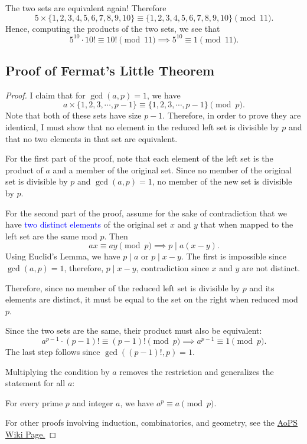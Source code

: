 \clearpage

The two sets are equivalent again! Therefore $$5\times \{1,2,3,4,5,6,7,8,9,10\}\equiv \{1,2,3,4,5,6,7,8,9,10\}\pmod{11}.$$ Hence, computing the products of the two sets, we see that $$5^{10}\cdot 10!\equiv 10!\pmod{11}\implies 5^{10}\equiv 1\pmod{11}.$$ 


\subsection{Proof of Fermat's Little Theorem}
\begin{proof} I claim that for $\gcd(a,p)=1$, we have $$a\times \{1, 2, 3, \cdots, p-1\}\equiv \{1, 2, 3, \cdots, p-1\}\pmod{p}.$$ Note that both of these sets have size $p-1$. Therefore, in order to prove they are identical, I must show that no element in the reduced left set is divisible by $p$ and that no two elements in that set are equivalent. 
	
For the first part of the proof, note that each element of the left set is the product of $a$ and a member of the original set. Since no member of the original set is divisible by $p$ and $\gcd(a,p)=1$, no member of the new set is divisible by $p$.

For the second part of the proof, assume for the sake of contradiction that we have \textcolor{blue}{two distinct elements} of the original set $x$ and $y$ that when mapped to the left set are the same mod $p$. Then $$ax\equiv ay\pmod{p}\implies p\mid a(x-y).$$ Using Euclid's Lemma, we have $p\mid a$ or $p\mid x-y$. The first is impossible since $\gcd(a,p)=1$, therefore, $p\mid x-y$, contradiction since $x$ and $y$ are not distinct.

Therefore, since no member of the reduced left set is divisible by $p$ and its elements are distinct, it must be equal to the set on the right when reduced mod $p$. 
\clearpage

Since the two sets are the same, their product must also be equivalent: $$a^{p-1}\cdot (p-1)!\equiv (p-1)!\pmod{p}\implies a^{p-1}\equiv 1\pmod{p}.$$ The last step follows since $\gcd\left((p-1)!, p\right)=1$.

Multiplying the condition by $a$ removes the restriction and generalizes the statement for all $a$: \begin{theorem}[Fermat] For every prime $p$ and integer $a$, we have $a^{p}\equiv a\pmod{p}$. \end{theorem} For other proofs involving induction, combinatorics, and geometry, see the \href{http://artofproblemsolving.com/wiki/index.php/Fermat\%27s_Little_Theorem}{AoPS Wiki Page.}

\end{proof}

